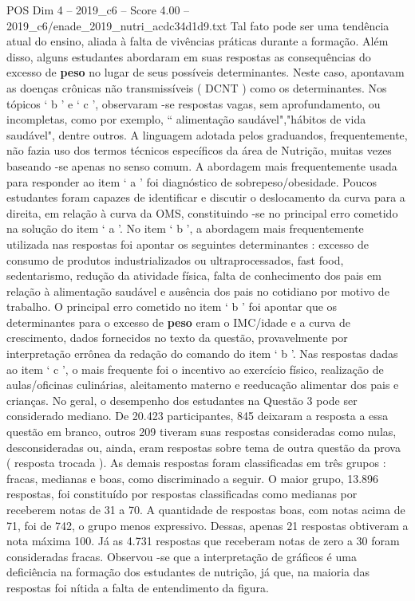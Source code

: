 \begin{textsample}{POS Dim 4 – 2019\_c6 – Score 4.00 – 2019\_c6/enade\_2019\_nutri\_acdc34d1d9.txt}
Tal fato pode ser uma tendência atual do ensino, aliada à falta de vivências práticas durante a formação.
Além disso, alguns estudantes abordaram em suas respostas as consequências do excesso de \textbf{peso} no lugar de seus possíveis determinantes.
Neste caso, apontavam as doenças crônicas não transmissíveis ( DCNT ) como os determinantes.
Nos tópicos ‘ b ’ e ‘ c ’, observaram -se respostas vagas, sem aprofundamento, ou incompletas, como por exemplo, “ alimentação saudável","hábitos de vida saudável", dentre outros.
A linguagem adotada pelos graduandos, frequentemente, não fazia uso dos termos técnicos específicos da área de Nutrição, muitas vezes baseando -se apenas no senso comum.
A abordagem mais frequentemente usada para responder ao item ‘ a ’ foi diagnóstico de sobrepeso/obesidade.
Poucos estudantes foram capazes de identificar e discutir o deslocamento da curva para a direita, em relação à curva da OMS, constituindo -se no principal erro cometido na solução do item ‘ a ’.
No item ‘ b ’, a abordagem mais frequentemente utilizada nas respostas foi apontar os seguintes determinantes : excesso de consumo de produtos industrializados ou ultraprocessados, fast food, sedentarismo, redução da atividade física, falta de conhecimento dos pais em relação à alimentação saudável e ausência dos pais no cotidiano por motivo de trabalho.
O principal erro cometido no item ‘ b ’ foi apontar que os determinantes para o excesso de \textbf{peso} eram o IMC/idade e a curva de crescimento, dados fornecidos no texto da questão, provavelmente por interpretação errônea da redação do comando do item ‘ b ’.
Nas respostas dadas ao item ‘ c ’, o mais frequente foi o incentivo ao exercício físico, realização de aulas/oficinas culinárias, aleitamento materno e reeducação alimentar dos pais e crianças.
No geral, o desempenho dos estudantes na Questão 3 pode ser considerado mediano.
De 20.423 participantes, 845 deixaram a resposta a essa questão em branco, outros 209 tiveram suas respostas consideradas como nulas, desconsideradas ou, ainda, eram respostas sobre tema de outra questão da prova ( resposta trocada ).
As demais respostas foram classificadas em três grupos : fracas, medianas e boas, como discriminado a seguir.
O maior grupo, 13.896 respostas, foi constituído por respostas classificadas como medianas por receberem notas de 31 a 70.
A quantidade de respostas boas, com notas acima de 71, foi de 742, o grupo menos expressivo.
Dessas, apenas 21 respostas obtiveram a nota máxima 100.
Já as 4.731 respostas que receberam notas de zero a 30 foram consideradas fracas.
Observou -se que a interpretação de gráficos é uma deficiência na formação dos estudantes de nutrição, já que, na maioria das respostas foi nítida a falta de entendimento da figura.

\end{textsample}
